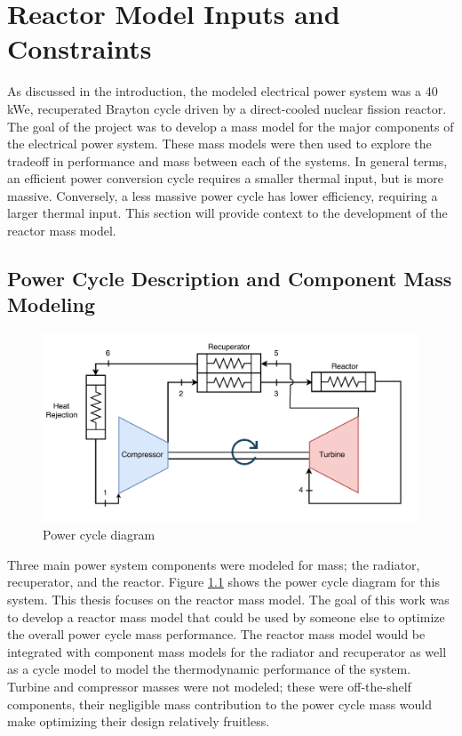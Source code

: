 \chapter{Reactor Model Inputs and Constraints}\label{ch:inputs_constraints}
As discussed in the introduction, the modeled electrical power system was a 40
kWe, recuperated Brayton cycle driven by a direct-cooled nuclear fission reactor. The goal
of the project was to develop a mass model for the major components of the
electrical power system. These mass models were then used to explore the
tradeoff in performance and mass between each of the systems. In general terms,
an efficient power conversion cycle requires a smaller thermal input, but is
more massive. Conversely, a less massive power cycle has lower efficiency,
requiring a larger thermal input. This section will provide context to the
development of the reactor mass model.

\section{Power Cycle Description and Component Mass Modeling}

\begin{figure}[h]
    \centering
    \includegraphics[width=5in]{../images/power_cycle.png}
\caption{Power cycle diagram}
\label{fig:power_cycle}
\end{figure}

Three main power system components were modeled for
mass; the radiator, recuperator, and the reactor. 
Figure \ref{fig:power_cycle} shows the power cycle diagram for this system.
This thesis focuses on the reactor mass model. The goal of this work was to
develop a reactor mass model that could be used by someone else to optimize 
the overall power cycle mass performance. The reactor mass model would be 
integrated with component mass models for the radiator and recuperator
as well as a cycle model to model the thermodynamic performance of the system.
Turbine and compressor masses were not modeled; these were off-the-shelf
components, their
negligible mass contribution to the power cycle mass would make optimizing their
design relatively fruitless.


